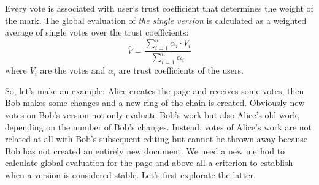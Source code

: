 \documentclass[a4paper,11pt]{article}
\begin{document}
 Every vote is associated with user's trust coefficient that determines the weight of the 
 mark. The global evaluation of \emph{the single version} is calculated as a weighted 
 average of single votes over the trust coefficients:
\begin{equation} \label{eq:v_medio}
\bar{V} = \frac{\displaystyle{\sum_{i=1}^n \alpha_i \cdot V_i}}{\displaystyle{\sum_{i=1}^n \alpha_i}}
\end{equation}
where $V_i$ are the votes and $\alpha_i$ are trust coefficients of the users.

So, let's make an example: Alice creates the page and receives some votes, then Bob makes 
some changes and a new ring of the chain is created. Obviously new votes on Bob's version 
not only evaluate Bob's work but also Alice's old work, depending on the number of Bob's 
changes. Instead, votes of Alice's work are not related at all with Bob's subsequent editing 
but cannot be thrown away because Bob has not created an entirely new document. We need a 
new method to calculate global evaluation for the page and above all a criterion to 
establish when a version is considered stable. Let's first explorate the latter.
\end{document}
